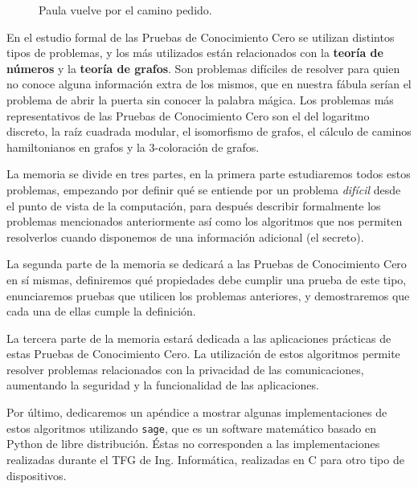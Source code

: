 \begin{figure}[!htb]
	\caption*{Paula vuelve por el camino pedido.\\ }\label{fig:awesome_image3}
	\endminipage
\end{figure}



\hfil

En el estudio formal de las Pruebas de Conocimiento Cero se utilizan distintos tipos de problemas, y los más utilizados est\'an relacionados con la \textbf{teor\'ia de n\'umeros}
y la \textbf{teor\'ia de grafos}. Son problemas difíciles de resolver para quien no conoce alguna información extra de los mismos, que en nuestra fábula serían el problema de abrir la puerta sin conocer la
palabra mágica. Los problemas más representativos de las Pruebas de Conocimiento Cero son el del logaritmo discreto, la raíz cuadrada modular, el isomorfismo de grafos, el c\'alculo de caminos
hamiltonianos en grafos y la 3-coloración de grafos.

La memoria se divide en tres partes, en la primera parte estudiaremos todos estos problemas, empezando por
definir qué se entiende por un problema \textit{difícil} desde el punto de vista de la computaci\'on, para despu\'es describir formalmente los problemas mencionados anteriormente
as\'i como los algoritmos que nos permiten resolverlos cuando disponemos de una informaci\'on adicional (el secreto).

La segunda parte de la memoria se dedicar\'a a las Pruebas de Conocimiento Cero en s\'i mismas, definiremos qué propiedades debe cumplir una prueba de este tipo,
enunciaremos pruebas que utilicen los problemas anteriores, y demostraremos que cada una de ellas cumple la definición.

La tercera parte de la memoria estar\'a dedicada a las aplicaciones prácticas de estas Pruebas de Conocimiento Cero. La utilizaci\'on de estos algoritmos permite resolver problemas
relacionados con la privacidad de las comunicaciones, aumentando la seguridad y la funcionalidad de las aplicaciones.

Por \'ultimo, dedicaremos un ap\'endice a mostrar algunas implementaciones de estos algoritmos utilizando {\tt sage}, que es un software matem\'atico basado en Python de
libre distribuci\'on. Éstas no corresponden a las implementaciones realizadas durante el TFG de Ing. Informática, realizadas en C para otro tipo de dispositivos.
